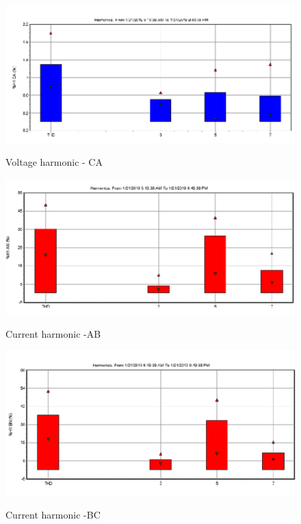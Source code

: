 \begin{figure}[!htb]
	\includegraphics[width=\textwidth]{figures/fig_ch04_elecaudit_harmonicstudy03} \\
	\caption{Voltage harmonic - CA}
	\label{fig_ch04_elecaudit_harmonicstudy03} 
\end{figure}

\begin{figure}[!htb]
	\includegraphics[width=\textwidth]{figures/fig_ch04_elecaudit_harmonicstudy04} \\
	\caption{Current harmonic -AB}
	\label{fig_ch04_elecaudit_harmonicstudy04} 
\end{figure}


\begin{figure}[!htb]
	\includegraphics[width=\textwidth]{figures/fig_ch04_elecaudit_harmonicstudy05} \\
	\caption{Current harmonic -BC}
	\label{fig_ch04_elecaudit_harmonicstudy05} 
\end{figure}


